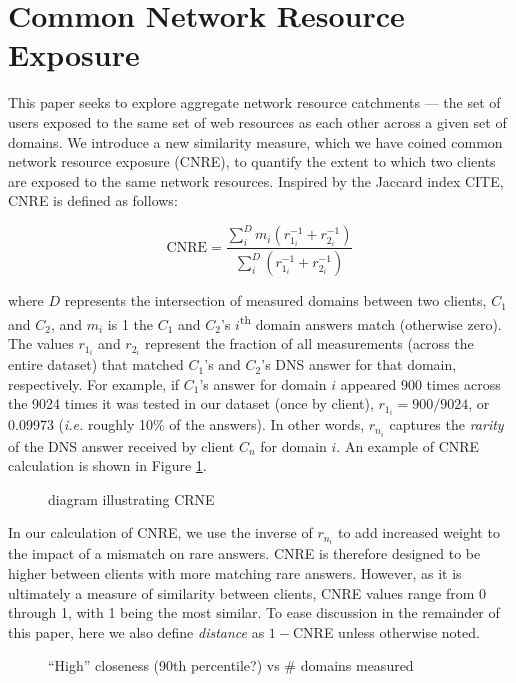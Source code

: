 \section{Common Network Resource Exposure} \label{sect:crne}

This paper seeks to explore aggregate network resource catchments --- the set of
users exposed to the same set of web resources as each other across a given set
of domains. We introduce a new similarity measure, which we have coined common
network resource exposure (CNRE), to quantify the extent to which two clients
are exposed to the same network resources. Inspired by the Jaccard index CITE,
CNRE is defined as follows:

\[ \textrm{CNRE} = \frac{ \sum_{i}^D  m_{i} (r_{1_i}^{-1}+r_{2_i}^{-1})}{ \sum_{i}^D (r_{1_i}^{-1}+r_{2_i}^{-1})} \]

where $D$ represents the intersection of measured domains between two clients,
$C_1$ and $C_2$, and $m_{i}$ is 1 the $C_{1}$ and $C_{2}$'s
$i$\textsuperscript{th} domain answers match (otherwise zero). The values
$r_{1_i}$ and $r_{2_i}$ represent the fraction of all measurements (across the
entire dataset) that matched $C_1$'s and $C_2$'s DNS answer for that domain,
respectively. For example, if $C_1$'s answer for domain $i$ appeared 900 times
across the 9024 times it was tested in our dataset (once by client), \(r_{1_i}
=  900 / 9024\), or 0.09973 (\emph{i.e.} roughly 10\% of the answers). In other words, $r_{n_i}$ captures the
\emph{rarity} of the DNS answer received by client $C_n$ for domain $i$. An
example of CNRE calculation is shown in Figure \ref{fig:cnre}.

\begin{figure}
    \caption{diagram illustrating CRNE}
    \label{fig:cnre}
\end{figure}

In our calculation of CNRE, we use the inverse of $r_{n_i}$ to add increased
weight to the impact of a mismatch on rare answers. CNRE is therefore designed
to be higher between clients with more matching rare answers. However, as it is
ultimately a measure of similarity between clients, CNRE values range from 0
through 1, with 1 being the most similar. To ease discussion in the remainder of
this paper, here we also define \emph{distance} as \(1 - \)CNRE unless otherwise
noted.

\begin{figure}
    \caption{“High” closeness (90th percentile?) vs \# domains measured}
    \label{fig:90cnre}
\end{figure}

